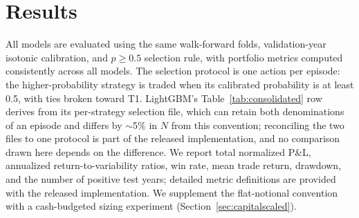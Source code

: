 \documentclass[sigconf,review,anonymous]{acmart}
\begin{document}
\section{Results}
\label{sec:results}

All models are evaluated using the same walk-forward folds, validation-year isotonic calibration, and $p\ge0.5$ selection rule, with portfolio metrics computed consistently across all models. The selection protocol is one action per episode: the higher-probability strategy is traded when its calibrated probability is at least 0.5, with ties broken toward T1. LightGBM's Table~\ref{tab:consolidated} row derives from its per-strategy selection file, which can retain both denominations of an episode and differs by $\sim$5\% in $N$ from this convention; reconciling the two files to one protocol is part of the released implementation, and no comparison drawn here depends on the difference. We report total normalized P\&L, annualized return-to-variability ratios, win rate, mean trade return, drawdown, and the number of positive test years; detailed metric definitions are provided with the released implementation. We supplement the flat-notional convention with a cash-budgeted sizing experiment (Section~\ref{sec:capitalscaled}).
\end{document}
